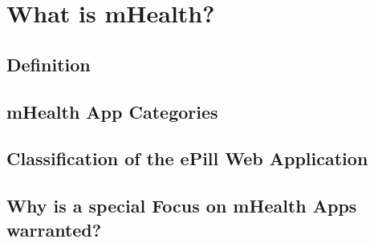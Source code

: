 \section{What is mHealth?}

\subsection{Definition}

\subsection{mHealth App Categories}

\subsection{Classification of the ePill Web Application}

\subsection{Why is a special Focus on mHealth Apps warranted?}